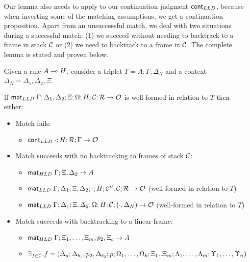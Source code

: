 Our lemma also needs to apply to our continuation judgment $\mathsf{cont}_{LLD}$, because
when inverting some of the matching assumptions, we get a continuation
proposition. Apart from an unsuccessful match, we deal with two situations
during a successful match: (1) we succeed without needing to backtrack to a
frame in stack $\mathcal{C}$ or (2) we need to backtrack to a frame in
$\mathcal{C}$. The complete lemma is stated and proven below.

\begin{lemma}\label{thm:body_match}
   
Given a rule $A \multimap H$, consider a triplet $T = A; \Gamma; \Delta_{N}$ and a
context $\Delta_{N} = \Delta_1, \Delta_2, \Xi$.

If $\mathsf{mat}_{LLD} \; \Gamma; \Delta_1, \Delta_2; \Xi; \Omega; H; \mathcal{C}; \mathcal{R}
\rightarrow \mathcal{O}$ is well-formed in relation to $T$ then either:

\begin{itemize}[leftmargin=*]
   \item Match fails:
   \begin{itemize}[leftmargin=\secondm]
      \item $\mathsf{cont}_{LLD} \; \cdot; H; \mathcal{R}; \Gamma \rightarrow \mathcal{O}$
   \end{itemize}

   \item Match succeeds with no backtracking to frames of stack $\mathcal{C}$:
   \begin{itemize}[leftmargin=\secondm]
      \item $\mathsf{mat}_{HLD} \; \Gamma; \Xi, \Delta_2 \rightarrow A$
      \item $\mathsf{mat}_{LLD} \; \Gamma; \Delta_1; \Xi, \Delta_2; \cdot; H; \mathcal{C''},
   \mathcal{C}; \mathcal{R}
         \rightarrow \mathcal{O}$ (well-formed in relation to $T$)
      \item $\mathsf{mat}_{LLD} \; \Gamma; \Delta_1; \Xi, \Delta_2; \Omega; H; \mathcal{C}; (\cdot, \Delta_N) \rightarrow \mathcal{O}$ (well-formed in relation to $T$)
   \end{itemize}

   \item Match succeeds with backtracking to a linear frame:
   \begin{itemize}[leftmargin=\secondm]
      \item $\mathsf{mat}_{HLD} \; \Gamma; \Xi_1, \dotsc, \Xi_m, p_2, \Xi_c \rightarrow A$
      \item $\exists_{f \in \mathcal{C}}. f = (\Delta_a; \Delta_{b_1}, p_2, \Delta_{b_2}; p;
            \Omega_1, \dotsc, \Omega_k; \Xi_1 .. \Xi_m; \Lambda_1, \dotsc,
            \Lambda_m; \Upsilon_1, \dotsc, \Upsilon_n)$


\end{itemize}
\end{itemize}
\end{lemma}
